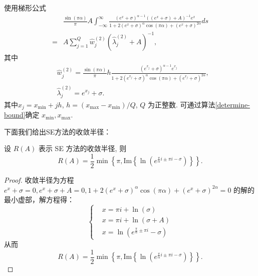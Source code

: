 使用梯形公式
\begin{equation}
	\begin{aligned}
		&\frac{\sin(\pi\alpha)}{\pi}A\int_{-\infty}^{\infty}\frac{(e^{ x}+\sigma)^{\alpha-1}((e^{ x}+\sigma)+{A})^{-1} e^{ x}}{1+2(e^{x}+\sigma)^{\alpha}\cos(\pi\alpha)+(e^{ x}+\sigma)^{2\alpha}}ds\\
		= & A\sum_{j=1}^Q \hat{w}^{(2)}_j(\hat{\lambda}^{(2)}_j+A)^{-1},
	\end{aligned}
\end{equation}
其中
\begin{equation}
	\begin{aligned}
		&\hat{w}^{(2)}_j=\frac{\sin(\pi\alpha)}{\pi}h\frac{(e^{ x_j}+\sigma)^{\alpha-1} e^{ x_j}}{1+2(e^{ x_j}+\sigma)^{\alpha}\cos(\pi\alpha)+(e^{ x_j}+\sigma)^{2\alpha}},\\
		&\hat{\lambda}^{(2)}_j=e^{ x_j}+\sigma.
	\end{aligned}
\end{equation}
其中$x_j=x_{\min}+jh$, $h=(x_{\max}-x_{\min})/Q$, $Q$ 为正整数.  可通过算法\ref{determine-bound}确定 $x_{\min}, x_{\max}$. 

下面我们给出SE方法的收敛半径：
\begin{theorem}
	设 \( R(A) \) 表示 SE 方法的收敛半径, 则 
	\begin{equation}
		R(A)=\frac{1}{2}\min\left\{
		\pi,\text{Im}\left\{\ln\left(e^{\frac{\pi}{\alpha}i\pm \pi i-\sigma}\right)\right\}
		\right\}.
	\end{equation}
\end{theorem}

\begin{proof}
	收敛半径为方程\(e^x+\sigma=0,e^x+\sigma+A=0,1+2(e^x+\sigma)^{\alpha}\cos(\pi \alpha)+(e^x+\sigma)^{2\alpha}=0\) 的解的最小虚部，解方程得：
	\begin{equation}
		\left\{
		\begin{aligned}
			&x=\pi i+\ln(\sigma)\\
			&x=\pi i+\ln(\sigma+A)\\
			&x=\ln(e^{\frac{\pi}{\alpha}\pm \pi i}-\sigma)
		\end{aligned}\right.
	\end{equation}
	从而
	\begin{equation}
		R(A)=\frac{1}{2}\min\left\{
		\pi,\text{Im}\left\{\ln\left(e^{\frac{\pi}{\alpha}i\pm \pi i-\sigma}\right)\right\}
		\right\}.
	\end{equation}
\end{proof}

